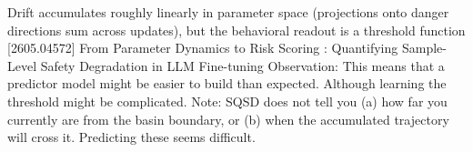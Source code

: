Drift accumulates roughly linearly in parameter space (projections onto danger directions sum across updates), but the behavioral readout is a threshold function
[2605.04572] From Parameter Dynamics to Risk Scoring : Quantifying Sample-Level Safety Degradation in LLM Fine-tuning
Observation: This means that a predictor model might be easier to build than expected. Although learning the threshold might be complicated.
Note: SQSD does not tell you (a) how far you currently are from the basin boundary, or (b) when the accumulated trajectory will cross it. Predicting these seems difficult. 

